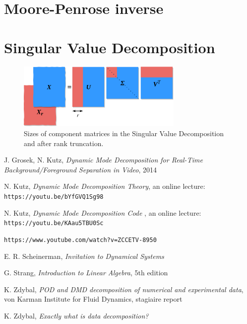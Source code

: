 \documentclass[10pt,twocolumn]{article}
\begin{document}
\section{Moore-Penrose inverse} \label{app:B}




\section{Singular Value Decomposition} \label{app:C}


\begin{figure}[H]
\centering\includegraphics[width=8cm]{svd.png}
\caption{Sizes of component matrices in the Singular Value Decomposition and after rank truncation.}
\label{fig:linear_system}
\end{figure}


\thebibliography{}

 J. Grosek, N. Kutz, \textit{Dynamic Mode Decomposition for Real-Time Background/Foreground Separation in Video}, 2014

 N. Kutz, \textit{Dynamic Mode Decomposition Theory}, an online lecture: \verb|https://youtu.be/bYfGVQ1Sg98| \label{bib:kutz_1}

 N. Kutz, \textit{Dynamic Mode Decomposition Code }, an online lecture: \verb|https://youtu.be/KAau5TBU0Sc| \label{bib:kutz_2}

 \verb|https://www.youtube.com/watch?v=ZCCETV-8950| \label{bib:andymation}

 E. R. Scheinerman, \textit{Invitation to Dynamical Systems}

 G. Strang, \textit{Introduction to Linear Algebra}, 5th edition

 K. Zdybal, \textit{POD and DMD decomposition of numerical and experimental data}, von Karman Institute for Fluid Dynamics, stagiaire report 

 K. Zdybal, \textit{Exactly what is data decomposition?}
\end{document}
